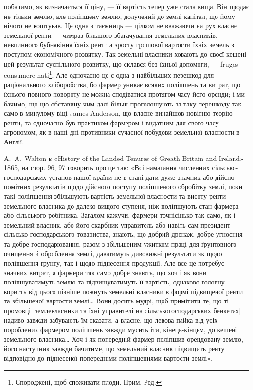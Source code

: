 \parcont{}  %
побачимо, як визначається її ціну, — її вартість тепер уже стала вища. Він продає
не тільки землю, але поліпшену землю, долучений до землі капітал, що йому
нічого не коштував. Це одна з таємниць — цілком не вважаючи на рух власне
земельної ренти — чимраз більшого збагачування земельних власників, невпинного бубнявіння їхніх рент
та зросту грошової вартости їхніх земель з поступом
економічного розвитку. Так земельні власники ховають до своєї кешені цей
результат суспільного розвитку, що склався без їхньої допомоги, — fruges consumere nati\footnote*{
Спороджені, щоб споживати плоди. Прим. Ред.
}. Але
одночасно це є одна з найбільших перешкод для раціонального хліборобства, бо фармер уникає всяких
поліпшень та витрат, що їхнього
повного повороту не можна сподіватися протягом часу його оренди; і ми
бачимо, що цю обставину чим далі більш проголошують за таку перешкоду
так само в минулому віці James Anderson, що власне винайшов новітню теорію
ренти, та одночасно був практиком-фармером і видатним для свого часу агрономом, як в наші дні
противники сучасної побудови земельної власности в Англії.

A.~A.~Walton в «History of the Landed Tenures of Greath Britain and
Ireland» 1865, на стор. 96, 97 говорить про це так: «Всі намагання численних
сільсько-господарських установ нашої країни не в стані дати дуже значних або
дійсно помітних результатів щодо дійсного поступу поліпшеного обробітку землі,
поки такі поліпшення збільшують вартість земельної власности та висоту ренти
земельного власника до далеко вищого ступеня, ніж поліпшують стан фармера
або сільського робітника. Загалом кажучи, фармери точнісінько так само, як
і земельний власник, або його скарбник-управитель або навіть сам президент
сільсько-господарського товариства, знають, що добрий дренаж, добре угноєння та добре
господарювання, разом з збільшеним ужитком праці для
ґрунтовного очищення й оброблення землі, даватимуть дивовижні результати
як щодо поліпшення ґрунту, так і щодо піднесення продукції. Але все це
потребує значних витрат, а фармери так само добре знають, що хоч і як
вони поліпшуватимуть землю та підвищуватимуть її вартість, однаково головну користь від цього
пізніше пожнуть земельні власники в формі підвищеної ренти та збільшеної вартости землі\dots{} Вони
досить мудрі, щоб
примітити те, що ті промовці [землевласники та їхні управителі на сільськогосподарських
бенкетах] надиво завжди забувають їм сказати, а власне, що
левова пайка від усіх пороблених фармером поліпшень завжди мусить іти,
кінець-кінцем, до кешені земельного власника\dots{} Хоч і як попередній фармер
поліпшив орендовану землю, його наступник завжди бачитиме, що земельний
власник підвищить ренту відповідно до піднесеної попередніми поліпшеннями
вартости землі».


